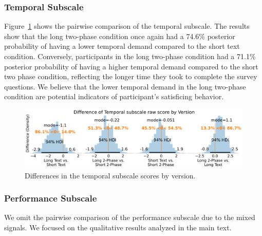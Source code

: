 \subsubsection{Temporal Subscale}
Figure~\ref{fig:bayesian_temporal_subscale} shows the pairwise comparison of the temporal subscale. The results show that the long two-phase condition once again had a 74.6\% posterior probability of having a lower temporal demand compared to the short text condition. Conversely, participants in the long two-phase condition had a 71.1\% posterior probability of having a higher temporal demand compared to the short two phase condition, reflecting the longer time they took to complete the survey questions. We believe that the lower temporal demand in the long two-phase condition are potential indicators of participant's satisficing behavior.

\begin{figure}[h!]
    \centering
    \includegraphics[width=\textwidth]{content/image/cog/Temporal_cog_diff_single_row.pdf}
    \caption{Differences in the temporal subscale scores by version.}
    \label{fig:bayesian_temporal_subscale}
\end{figure}

\subsubsection{Performance Subscale}
We omit the pairwise comparison of the performance subscale due to the mixed signals. We focused on the qualitative results analyzed in the main text.


